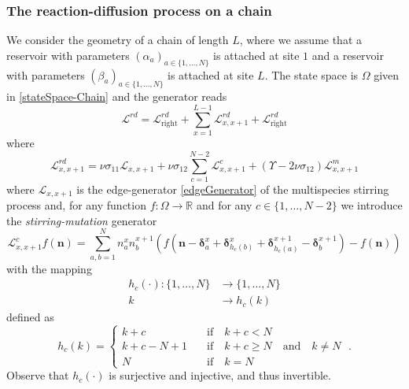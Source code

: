 \documentclass[10pt]{article}
\numberwithin{equation}{section}
\numberwithin{equation}{subsection}
\newcommand{\dt}{\;.}
\begin{document}
\subsubsection{The reaction-diffusion process on a chain}
We consider the geometry of a chain of length $L$, where we assume that a reservoir with parameters $(\alpha_{a})_{a\in\{1,\ldots,N\}}$ is attached at site $1$ and a reservoir with parameters $(\beta_{a})_{a\in\{1,\ldots,N\}}$ is attached at site $L$. The state space is $\Omega$ given in \eqref{stateSpace-Chain} and the generator reads
\begin{equation}\label{RDGenerator}
	\mathcal{L}^{rd}=\mathcal{L}_{\text{right}}^{rd}+\sum_{x=1}^{L-1}\mathcal{L}_{x,x+1}^{rd}+\mathcal{L}_{\text{right}}^{rd}
\end{equation}
where
\begin{equation}\label{edgeGeneratorRD}
	\mathcal{L}_{x,x+1}^{rd}=\nu \sigma_{11}\mathcal{L}_{x,x+1}+\nu \sigma_{12}\sum_{c=1}^{N-2}\mathcal{L}_{x,x+1}^{c}+(\Upsilon-2\nu\sigma_{12})\mathcal{L}_{x,x+1}^{m}
\end{equation}
where $\mathcal{L}_{x,x+1}$ is the edge-generator \eqref{edgeGenerator} of the multispecies stirring process and, for any function $f:\Omega\to \mathbb{R}$ and for any $c\in \{1,\ldots,N-2\}$ we introduce the \textit{stirring-mutation} generator
\begin{equation}
	\mathcal{L}_{x,x+1}^{c}f(\bm{n})=\sum_{a,b=1}^{N}n_{a}^{x}n_{b}^{x+1}\left(f(\bm{n}-\bm{\delta}_{a}^{x}+\bm{\delta}_{h_{c}(b)}^{x}+\bm{\delta}_{h_{c}(a)}^{x+1}-\bm{\delta}_{b}^{x+1})-f(\bm{n})\right)
\end{equation}
with the mapping 
\begin{equation}
	\begin{split}
		h_{c}(\cdot):\{1,\ldots,N\}&\to\{1,\ldots,N\}\\
		k&\to h_{c}(k)
	\end{split}
\end{equation}
defined as
\begin{equation}
	h_{c}(k)=\begin{cases}
		k+c \quad &\text{if}\quad k+c< N \\
		k+c-N+1\quad &\text{if}\quad k+c\geq N\quad \text{and}\quad k\neq N\\
		N\quad &\text{if}\quad k=N
	\end{cases}\dt
\end{equation}
Observe that $h_{c}(\cdot)$ is surjective and injective, and thus invertible. 
\end{document}
